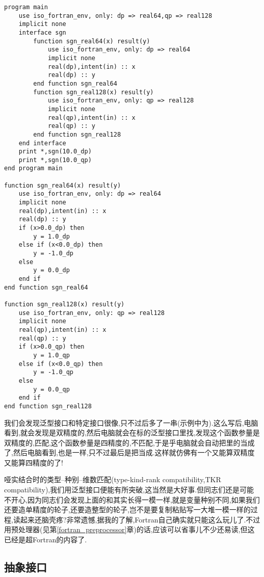 \begin{lstlisting}
program main
    use iso_fortran_env, only: dp => real64,qp => real128
    implicit none
    interface sgn
        function sgn_real64(x) result(y)
            use iso_fortran_env, only: dp => real64
            implicit none
            real(dp),intent(in) :: x
            real(dp) :: y
        end function sgn_real64
        function sgn_real128(x) result(y)
            use iso_fortran_env, only: qp => real128
            implicit none
            real(qp),intent(in) :: x
            real(qp) :: y
        end function sgn_real128
    end interface
    print *,sgn(10.0_dp)
    print *,sgn(10.0_qp)
end program main

function sgn_real64(x) result(y)
    use iso_fortran_env, only: dp => real64
    implicit none
    real(dp),intent(in) :: x
    real(dp) :: y
    if (x>0.0_dp) then
        y = 1.0_dp
    else if (x<0.0_dp) then
        y = -1.0_dp
    else
        y = 0.0_dp
    end if
end function sgn_real64

function sgn_real128(x) result(y)
    use iso_fortran_env, only: qp => real128
    implicit none
    real(qp),intent(in) :: x
    real(qp) :: y
    if (x>0.0_qp) then
        y = 1.0_qp
    else if (x<0.0_qp) then
        y = -1.0_qp
    else
        y = 0.0_qp
    end if
end function sgn_real128
\end{lstlisting}
我们会发现泛型接口和特定接口很像,只不过后多了一串(示例中为).这么写后,电脑看到,就会发现是双精度的,然后电脑就会在标的泛型接口里找,发现这个函数参量是双精度的,匹配,这个函数参量是四精度的,不匹配,于是乎电脑就会自动把里的当成了,然后电脑看到,也是一样,只不过最后是把当成.这样就仿佛有一个又能算双精度又能算四精度的了!

哑实结合时的类型--种别--维数匹配(type-kind-rank compatibility,TKR compatibility),我们用泛型接口便能有所突破,这当然是大好事.但同志们还是可能不开心,因为同志们会发现上面的和其实长得一模一样,就是变量种别不同,如果我们还要造单精度的轮子,还要造整型的轮子,岂不是要复制粘贴写一大堆一模一样的过程,读起来还脑壳疼?非常遗憾,据我的了解,Fortran自己确实就只能这么玩儿了.不过用预处理器(见第\ref{fortran_preprocessor}章)的话,应该可以省事儿不少还易读,但这已经是超Fortran的内容了.

\subsection{抽象接口}


